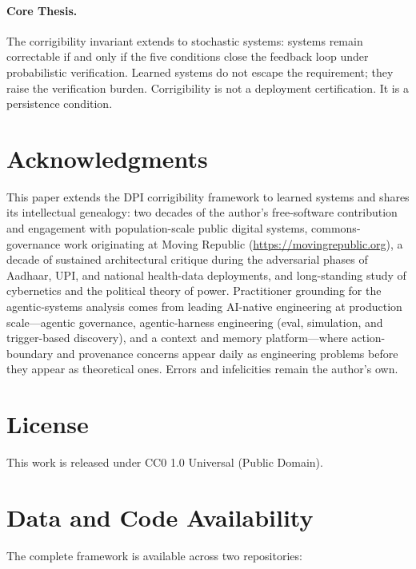 \documentclass{article}
\theoremstyle{definition}
\begin{document}
\paragraph{Core Thesis.} The corrigibility invariant extends to stochastic systems: systems remain correctable if and only if the five conditions close the feedback loop under probabilistic verification. Learned systems do not escape the requirement; they raise the verification burden. Corrigibility is not a deployment certification. It is a persistence condition.

\section*{Acknowledgments}

This paper extends the DPI corrigibility framework \citep{aravind2026dpi} to learned systems and shares its intellectual genealogy: two decades of the author's free-software contribution and engagement with population-scale public digital systems, commons-governance work originating at Moving Republic (\url{https://movingrepublic.org}), a decade of sustained architectural critique during the adversarial phases of Aadhaar, UPI, and national health-data deployments, and long-standing study of cybernetics and the political theory of power. Practitioner grounding for the agentic-systems analysis comes from leading AI-native engineering at production scale---agentic governance, agentic-harness engineering (eval, simulation, and trigger-based discovery), and a context and memory platform---where action-boundary and provenance concerns appear daily as engineering problems before they appear as theoretical ones. Errors and infelicities remain the author's own.

\section*{License}

This work is released under CC0 1.0 Universal (Public Domain).

\section*{Data and Code Availability}

The complete framework is available across two repositories:
\end{document}
